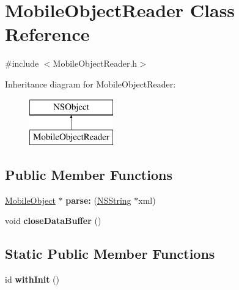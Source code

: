 \hypertarget{interface_mobile_object_reader}{
\section{\-Mobile\-Object\-Reader \-Class \-Reference}
\label{interface_mobile_object_reader}
}


{\ttfamily \#include $<$\-Mobile\-Object\-Reader.\-h$>$}

\-Inheritance diagram for \-Mobile\-Object\-Reader\-:\begin{figure}[H]
\begin{center}
\leavevmode
\includegraphics[height=2.000000cm]{interface_mobile_object_reader}
\end{center}
\end{figure}
\subsection*{\-Public \-Member \-Functions}
\begin{DoxyCompactItemize}
\item 
\hypertarget{interface_mobile_object_reader_ac008fbfa2104ff46af72049909d60df0}{
\hyperlink{interface_mobile_object}{\-Mobile\-Object} $\ast$ {\bfseries parse\-:} (\hyperlink{class_n_s_string}{\-N\-S\-String} $\ast$xml)}
\label{interface_mobile_object_reader_ac008fbfa2104ff46af72049909d60df0}

\item 
\hypertarget{interface_mobile_object_reader_ae66555cc7b452a2655201e54608f0b45}{
void {\bfseries close\-Data\-Buffer} ()}
\label{interface_mobile_object_reader_ae66555cc7b452a2655201e54608f0b45}

\end{DoxyCompactItemize}
\subsection*{\-Static \-Public \-Member \-Functions}
\begin{DoxyCompactItemize}
\item 
\hypertarget{interface_mobile_object_reader_aef3a4159a0a1dd6b50273a0b43536fd1}{
id {\bfseries with\-Init} ()}
\label{interface_mobile_object_reader_aef3a4159a0a1dd6b50273a0b43536fd1}

\end{DoxyCompactItemize}


